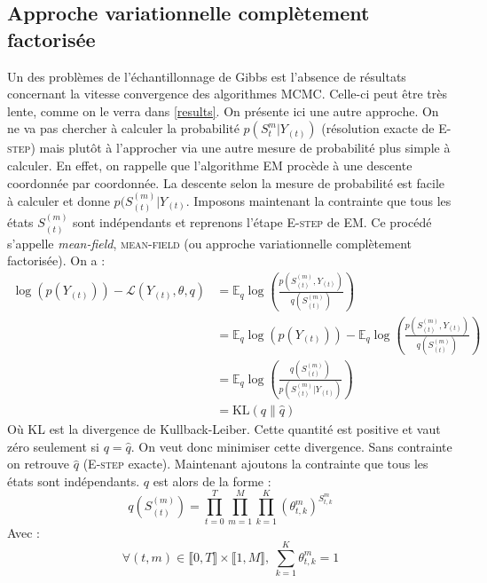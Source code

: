 \documentclass[10pt,a4paper]{article}
\newcommand{\mcmc}{\textsc{MCMC}}
\newcommand{\Estep}{\textsc{E-step}}
\newcommand{\EM}{\textsc{EM}}
\newcommand{\meanfield}{\textsc{mean-field}}
\begin{document}
\subsection{Approche variationnelle complètement factorisée}
Un des problèmes de l'échantillonnage de Gibbs est l'absence de résultats 
concernant la vitesse convergence des algorithmes \mcmc. Celle-ci peut être 
très lente, comme on le verra dans \ref{results}. On présente ici une autre 
approche. On ne va pas chercher à calculer la probabilité $p( S_t^m \vert 
Y_{(t)})$ (résolution exacte de \Estep) mais plutôt à l'approcher via une autre 
mesure de probabilité plus simple à calculer. En effet, on rappelle que 
l'algorithme \EM{} procède à une descente coordonnée par coordonnée. La 
descente 
selon la mesure de probabilité est facile à calculer et donne $p(S_{(t)}^{(m)} 
\vert Y_{(t)}$. Imposons maintenant la contrainte que tous les états 
$S_{(t)}^{(m)}$ sont indépendants et reprenons l'étape \Estep{} de \EM. Ce 
procédé 
s'appelle \textit{mean-field}, \meanfield{} (ou approche variationnelle 
complètement factorisée). On a :
\begin{equation}
\begin{aligned}
\log(p(Y_{(t)}))-\mathcal{L}(Y_{(t)}, \theta, q)&= \mathbb{E}_q \log \left( 
\frac{p(S_{(t)}^{(m)}, Y_{(t)})}{q(S_{(t)}^{(m)})}\right)\\
&=\mathbb{E}_q \log(p(Y_{(t)}))-\mathbb{E}_q \log \left( \frac{p(S_{(t)}^{(m)}, 
Y_{(t)})}{q(S_{(t)}^{(m)})}\right)\\
&=\mathbb{E}_q \log \left( \frac{q(S_{(t)}^{(m)})}{p(S_{(t)}^{(m)} \vert 
Y_{(t)})} \right) \\
&= \text{KL}(q \| \hat{q})
\end{aligned}
\end{equation}
Où KL est la divergence de Kullback-Leiber. Cette quantité est positive et vaut 
zéro seulement si $q=\hat{q}$. On veut donc minimiser cette divergence. Sans 
contrainte on retrouve $\hat{q}$ (\Estep{} exacte). Maintenant ajoutons la 
contrainte que tous les états sont indépendants. $q$ est alors de la forme :
\begin{equation}
q(S_{(t)}^{(m)}) = \underset{t=0}{\overset{T}{\prod}} 
\underset{m=1}{\overset{M}{\prod}} \underset{k=1}{\overset{K}{\prod}} \left( 
\theta_{t,k}^m \right)^{S_{t,k}^m}
\end{equation}
Avec :
\begin{equation}
\forall (t,m) \in \llbracket 0,T \rrbracket \times \llbracket 1, M \rrbracket, 
\ \underset{k=1}{\overset{K}{\sum}} \theta_{t,k}^m = 1
\end{equation}
\end{document}
